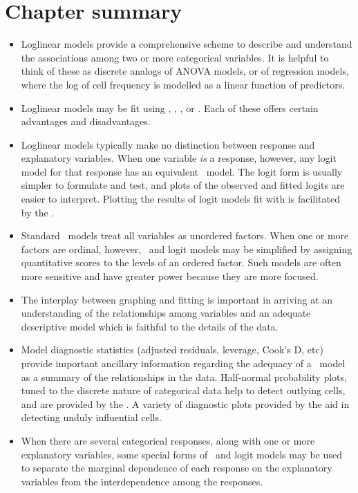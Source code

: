 




\section{Chapter summary}
\begin{itemize}
\item Loglinear models provide a comprehensive scheme to describe and
understand the associations among two or more categorical variables.
It is helpful to think of these as discrete analogs of ANOVA models,
or of regression models, where the log of cell frequency is modelled
as a linear function of predictors.

\item Loglinear models may be fit using , ,
\INSIGHT, or \IML.  Each of these offers certain advantages and
disadvantages.

\item Loglinear models typically make no distinction between response
and explanatory variables.
When one variable \emph{is} a response, however, any logit model for
that response has an equivalent \loglin\ model.
The logit form is usually simpler to formulate and test, and plots of
the observed and fitted logits are easier to interpret.
Plotting the results of logit models fit with 
is facilitated by the .

\item Standard \loglin\ models treat all variables as unordered factors.
When one or more factors are ordinal, however, \loglin\ and logit models
may be simplified by assigning quantitative scores to the levels of
an ordered factor.
Such models are often more sensitive and have greater power because they
are more focused.

\item The interplay between graphing and fitting is important in 
arriving at an understanding of the relationships among variables and
an adequate descriptive model which is faithful to the details of the
data.

\item Model diagnostic statistics
(adjusted residuals, leverage, Cook's D, etc)
provide important ancillary information regarding the adequacy of
a \loglin\ model as a summary of the relationships in the data.
Half-normal probability plots, tuned to the discrete nature of categorical
data help to detect outlying cells, and are provided by the .
A variety of diagnostic plots provided by the 
aid in detecting unduly influential cells.

\item When there are several categorical responses, along with one or
more explanatory variables, some special forms of \loglin\ and logit
models may be used to separate the marginal dependence of each response
on the explanatory variables from the interdependence among the responses.


\end{itemize}

